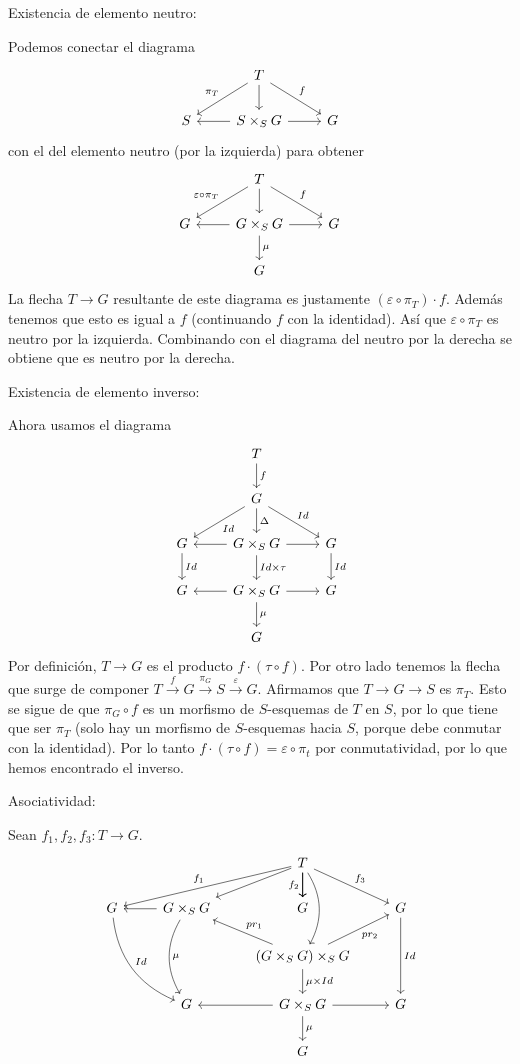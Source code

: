 \documentclass[GA.tex]{subfiles}
\begin{document}
\begin{dem}
Existencia de elemento neutro: 

Podemos conectar el diagrama
\[
\begin{tikzcd}
 & T\arrow[dl, "\pi_T"']\arrow[dr, "f"]\arrow[d] & \\
 S & S\times_S G\arrow[r] \arrow[l] & G
\end{tikzcd}
\]
con el del elemento neutro (por la izquierda) para obtener
\[
\begin{tikzcd}
 & T\arrow[dl, "\varepsilon\circ\pi_T"']\arrow[dr, "f"] \arrow[d]& \\
G & \arrow[l]\arrow[r]\arrow[d, "\mu"]G\times_S G & G\\
& G &  
\end{tikzcd}
\] 
La flecha $T\to G$ resultante de este diagrama es justamente $(\varepsilon\circ\pi_T)\cdot f$. Además tenemos que esto es igual a $f$ (continuando $f$ con la identidad). Así que $\varepsilon\circ\pi_T$ es neutro por la izquierda. Combinando con el diagrama del neutro por la derecha se obtiene que es neutro por la derecha. 

Existencia de elemento inverso:

Ahora usamos el diagrama
\[
\begin{tikzcd}
& T\arrow[d, "f"] &\\
& G\arrow[dl, "Id"]\arrow[dr, "Id"] \arrow[d, "\Delta"]& \\
G\arrow[d, "Id"] & \arrow[l]\arrow[r]G\times_S G\arrow[d, "Id\times\tau"]& G\arrow[d, "Id"]\\
G & \arrow[l]\arrow[r]G\times_S G\arrow[d,"\mu"]& G\\
& G &
\end{tikzcd}
\]
Por definición, $T\to G$ es el producto $f\cdot (\tau\circ f)$. Por otro lado tenemos la flecha que surge de componer $T\xrightarrow{f}G\xrightarrow{\pi_G}S\xrightarrow{\varepsilon}G$.  Afirmamos que $T\to G\to S$ es $\pi_T$. Esto se sigue de que $\pi_G\circ f$ es un morfismo de $S$-esquemas de $T$ en $S$, por lo que tiene que ser $\pi_T$ (solo hay un morfismo de $S$-esquemas hacia $S$, porque debe conmutar con la identidad). Por lo tanto $f\cdot (\tau\circ f)=\varepsilon\circ\pi_t$ por conmutatividad, por lo que hemos encontrado el inverso. 

Asociatividad:

Sean $f_1,f_2,f_3:T\to G$. 
\[
\begin{tikzcd}
 &  & T \arrow[rd, "f_3"] \arrow[d] \arrow[ld] \arrow[d] \arrow[d, "f_2"'] \arrow[dd, bend left] \arrow[lld, "f_1"'] &  \\
G \arrow[rdd, "Id", bend right] & G\times_SG \arrow[l] \arrow[dd, "\mu", bend right] & G & G \arrow[dd, "Id"] \\
 &  & (G\times_S G)\times_SG \arrow[lu, "pr_1"'] \arrow[d, "\mu\times Id"] \arrow[ru, "pr_2"'] &  \\
 & G & G\times_S G \arrow[d, "\mu"] \arrow[l] \arrow[r] & G \\
 &  & G & 
\end{tikzcd}
\]



\end{dem}
\end{document}
